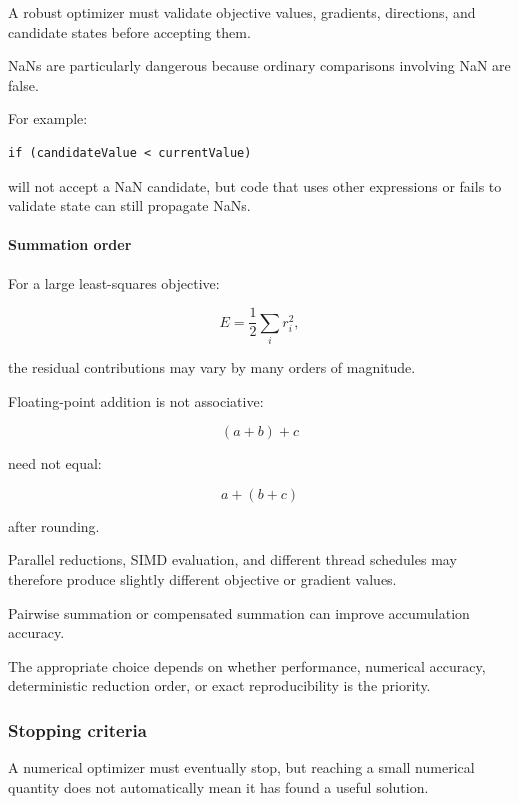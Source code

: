A robust optimizer must validate objective values, gradients, directions, and candidate states before accepting them.

NaNs are particularly dangerous because ordinary comparisons involving NaN are false.

For example:

\begin{verbatim}
if (candidateValue < currentValue)
\end{verbatim}

will not accept a NaN candidate, but code that uses other expressions or fails to validate state can still propagate NaNs.

\paragraph{Summation order}\label{02-foundations-ii-ch027-summation-order}

\hypertarget{02-foundations-ii-ch027-summation-order}{}

For a large least-squares objective:

\[
E=\frac12\sum_i r_i^2,
\]

the residual contributions may vary by many orders of magnitude.

Floating-point addition is not associative:

\[
(a+b)+c
\]

need not equal:

\[
a+(b+c)
\]

after rounding.

Parallel reductions, SIMD evaluation, and different thread schedules may therefore produce slightly different objective or gradient values.

Pairwise summation or compensated summation can improve accumulation accuracy.

The appropriate choice depends on whether performance, numerical accuracy, deterministic reduction order, or exact reproducibility is the priority.

\subsubsection{Stopping criteria}\label{02-foundations-ii-ch027-stopping-criteria}

\hypertarget{02-foundations-ii-ch027-stopping-criteria}{}

A numerical optimizer must eventually stop, but reaching a small numerical quantity does not automatically mean it has found a useful solution.

